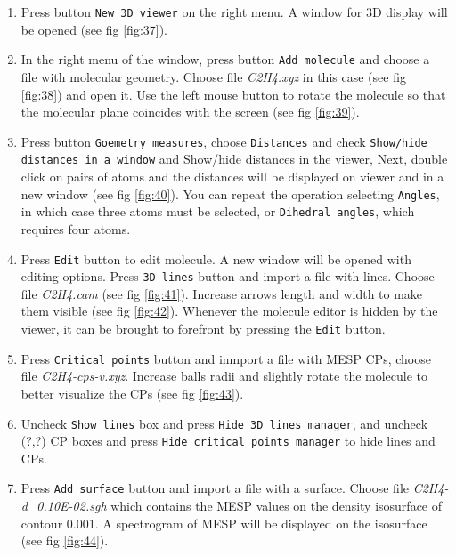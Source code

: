 \documentclass[a4paper,10pt]{article}
\begin{document}
\begin{enumerate}

\item  Press button \texttt{New 3D viewer} on the right menu. A window for 3D display
will be opened (see fig \ref{fig:37}). 

\item In the right menu of the window, press button \texttt{Add molecule} and
choose a file with molecular geometry. Choose file {\it C2H4.xyz} in this case 
(see fig \ref{fig:38}) and open it. Use the left mouse button to rotate the
molecule so that the molecular plane coincides with the screen (see fig \ref{fig:39}).

\item Press button \texttt{Goemetry measures}, choose \texttt{Distances}
and check \texttt{Show/hide distances in a window} and
{Show/hide distances in the viewer}, Next, double click on pairs of atoms
and the distances will be displayed on viewer and in a new window
(see fig \ref{fig:40}). You can repeat the operation selecting \texttt{Angles},
in which case three atoms must be selected, or \texttt{Dihedral angles},
which requires four atoms.

\item Press \texttt{Edit} button to edit molecule. A new window will be opened
with editing options. Press \texttt{3D lines} button and import a file
with lines. Choose file {\it C2H4.cam} (see fig \ref{fig:41}).
Increase arrows length and width to make them visible (see fig \ref{fig:42}).
Whenever the molecule editor is hidden by the viewer, it can be 
brought to forefront by pressing the \texttt{Edit} button.

\item Press \texttt{Critical points} button and inmport a file with
MESP CPs, choose file {\it C2H4-cps-v.xyz}. Increase balls radii 
and slightly rotate the molecule to better visualize the CPs
(see fig \ref{fig:43}).

\item Uncheck \texttt{Show lines} box and press \texttt{Hide 3D lines manager},
and uncheck (?,?) CP boxes and press \texttt{Hide critical points manager}
to hide lines and CPs.

\item Press \texttt{Add surface} button and import a file with a surface.
Choose file {\it C2H4-d\_0.10E-02.sgh} which contains the MESP
values on the density isosurface of contour 0.001. A spectrogram of MESP 
will be displayed on the isosurface (see fig \ref{fig:44}).


\end{enumerate}
\end{document}
